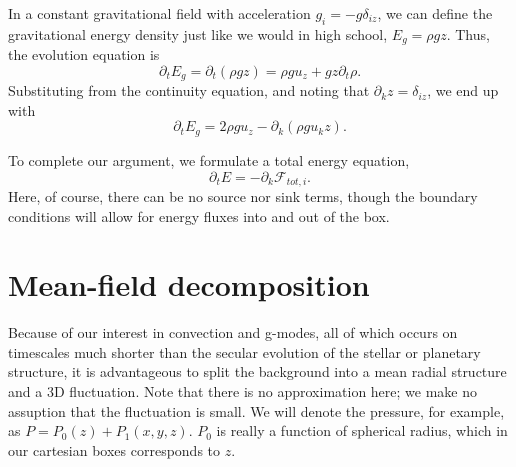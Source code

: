 \documentclass[letterpaper,12pt]{paper}
\begin{document}
In a constant gravitational field with acceleration
$g_i = -g \delta_{iz}$, we can define the gravitational energy density
just like we would in high school, $E_g = \rho g z$. Thus, the
evolution equation is 
\begin{equation}
  \label{eq:grav_en}
  \partial_t E_g = \partial_t (\rho g z) = \rho g u_z + g z \partial_t \rho.
\end{equation}
Substituting from the continuity equation, and noting that $\partial_k
z = \delta_{iz}$, we end up with
\begin{equation}
  \label{eq:grav_en_final}
  \partial_t E_g = 2 \rho g u_z - \partial_k (\rho g u_k z).
\end{equation}

To complete our argument, we formulate a total energy equation,
\begin{equation}
  \label{eq:total_energy}
  \partial_t E = - \partial_k \mathcal{F}_{tot,i}.
\end{equation}
Here, of course, there can be no source nor sink terms, though the
boundary conditions will allow for energy fluxes into and out of the
box. 

\section{Mean-field decomposition}
\label{sec:meanfield}
Because of our interest in convection and g-modes, all of which occurs
on timescales much shorter than the secular evolution of the stellar
or planetary structure, it is advantageous to split the background
into a mean radial structure and a 3D fluctuation. Note that there is
no approximation here; we make no assuption that the fluctuation is
small. We will denote the pressure, for example, as $P = P_0(z) +
P_1(x,y,z)$. $P_0$ is really a function of spherical radius, which in our
cartesian boxes corresponds to $z$. 
\end{document}
